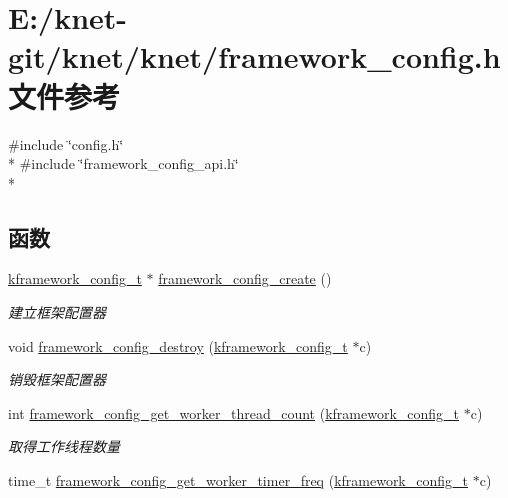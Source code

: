 \hypertarget{a00058}{}\section{E\+:/knet-\/git/knet/knet/framework\+\_\+config.h 文件参考}
\label{a00058}
{\ttfamily \#include \char`\"{}config.\+h\char`\"{}}\\*
{\ttfamily \#include \char`\"{}framework\+\_\+config\+\_\+api.\+h\char`\"{}}\\*
\subsection*{函数}
\begin{DoxyCompactItemize}
\item 
\hyperlink{a00053_adeaf952e0f0887507ff836385bf54874_adeaf952e0f0887507ff836385bf54874}{kframework\+\_\+config\+\_\+t} $\ast$ \hyperlink{a00058_abb53b259903568ee8684e2979d5419cb_abb53b259903568ee8684e2979d5419cb}{framework\+\_\+config\+\_\+create} ()
\begin{DoxyCompactList}\small\item\em 建立框架配置器 \end{DoxyCompactList}\item 
void \hyperlink{a00058_a94f3ef660e9dd4e8c9b4a4f113c35833_a94f3ef660e9dd4e8c9b4a4f113c35833}{framework\+\_\+config\+\_\+destroy} (\hyperlink{a00053_adeaf952e0f0887507ff836385bf54874_adeaf952e0f0887507ff836385bf54874}{kframework\+\_\+config\+\_\+t} $\ast$c)
\begin{DoxyCompactList}\small\item\em 销毁框架配置器 \end{DoxyCompactList}\item 
int \hyperlink{a00058_aafb4c7a8913ed48592037da43edd8e39_aafb4c7a8913ed48592037da43edd8e39}{framework\+\_\+config\+\_\+get\+\_\+worker\+\_\+thread\+\_\+count} (\hyperlink{a00053_adeaf952e0f0887507ff836385bf54874_adeaf952e0f0887507ff836385bf54874}{kframework\+\_\+config\+\_\+t} $\ast$c)
\begin{DoxyCompactList}\small\item\em 取得工作线程数量 \end{DoxyCompactList}\item 
time\+\_\+t \hyperlink{a00058_ab0815a3aff5ee221ba2870899e25f045_ab0815a3aff5ee221ba2870899e25f045}{framework\+\_\+config\+\_\+get\+\_\+worker\+\_\+timer\+\_\+freq} (\hyperlink{a00053_adeaf952e0f0887507ff836385bf54874_adeaf952e0f0887507ff836385bf54874}{kframework\+\_\+config\+\_\+t} $\ast$c)

\end{DoxyCompactItemize}
